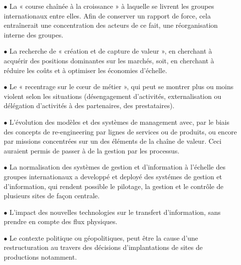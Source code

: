 \documentclass[12pt,a4paper]{article}
\begin{document}
\begin{itemize}

\item[$\bullet$]La « course chaînée à la croissance » à laquelle se livrent les groupes internationaux entre elles. Afin de conserver un rapport de force, cela entraînerait une concentration des acteurs de ce fait, une réorganisation interne des groupes.\\

\item[$\bullet$]La recherche de « création et de capture de valeur », en cherchant à acquérir des positions dominantes sur les marchés, soit, en cherchant à réduire les coûts et à optimiser les économies d’échelle. \\

\item[$\bullet$]Le « recentrage sur le cœur de métier », qui peut se montrer plus ou moins violent selon les situations (désengagement d'activités, externalisation ou délégation d'activités à des partenaires, des prestataires).\\


\item[$\bullet$]L'évolution des modèles et des systèmes de management avec, par le biais des concepts de re-engineering par lignes de services ou de produits, ou encore par missions concentrées sur un des éléments de la chaîne de valeur. Ceci auraient permis de passer à de la gestion par les processus.\\


\item[$\bullet$]La normalisation des systèmes de gestion et d’information à l’échelle des groupes internationaux a developpé et deployé des systémes de gestion et d'information, qui rendent possible le pilotage, la gestion et le contrôle de plusieurs sites de façon centrale. \\

\item[$\bullet$]L'impact des nouvelles technologies sur le transfert d'information, sans prendre en compte des flux physiques.\\

\item[$\bullet$]Le contexte politique ou géopolitiques, peut être la cause d'une restructuration au travers des décisions d’implantations de sites de productions notamment.\\

\end{itemize}
\end{document}
